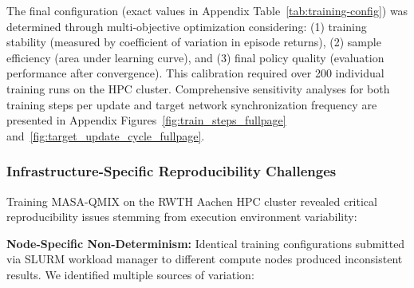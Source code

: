 The final configuration (exact values in Appendix Table~\ref{tab:training-config}) was determined through multi-objective optimization considering: (1) training stability (measured by coefficient of variation in episode returns), (2) sample efficiency (area under learning curve), and (3) final policy quality (evaluation performance after convergence). This calibration required over 200 individual training runs on the HPC cluster. Comprehensive sensitivity analyses for both training steps per update and target network synchronization frequency are presented in Appendix Figures~\ref{fig:train_steps_fullpage} and~\ref{fig:target_update_cycle_fullpage}.

\subsubsection{Infrastructure-Specific Reproducibility Challenges}

Training MASA-QMIX on the RWTH Aachen HPC cluster revealed critical reproducibility issues stemming from execution environment variability:

\textbf{Node-Specific Non-Determinism:} Identical training configurations submitted via SLURM workload manager to different compute nodes produced inconsistent results. We identified multiple sources of variation:

